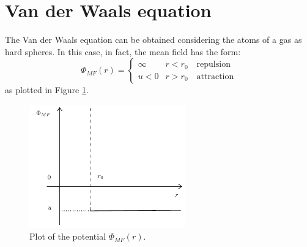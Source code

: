 \documentclass[../../Main/Main.tex]{subfiles}
\begin{document}
\section{Van der Waals equation}
The Van der Waals equation can be obtained considering the atoms of a gas as hard spheres. In this case, in fact, the mean field has the form:
\begin{equation}
\Phi _{MF} (r) =
  \begin{cases}
   \infty & r < r_0 \quad  \text{repulsion}\\
   u < 0 & r> r_0  \quad \text{attraction}
  \end{cases}
\end{equation}
as plotted in Figure \ref{fig:14_1}.
\begin{figure}[H]
\centering
\includegraphics[width=0.6\textwidth]{./img/1.pdf}
\caption{\label{fig:14_1} Plot of the potential \( \Phi _{MF} (r) \).}
\end{figure}
\end{document}
